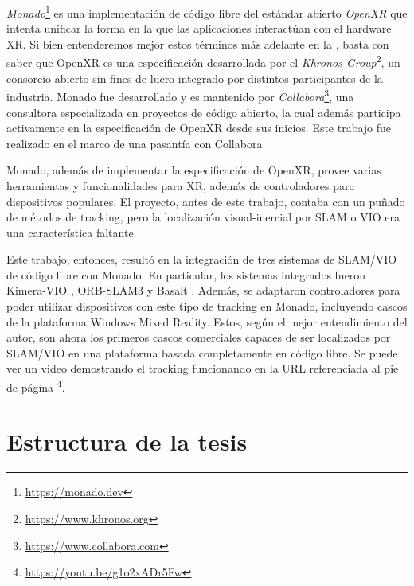 \documentclass[ twoside,openright,titlepage,numbers=noenddot,%
                headinclude,footinclude,cleardoublepage=empty,abstract=on,
                BCOR=-5mm,paper=a4,fontsize=11pt
                ]{scrreprt}
\begin{document}
\emph{Monado}\footnote{\url{https://monado.dev}} es una implementación
de código libre del estándar abierto \emph{OpenXR}
\autocite{thekhronosgroupinc.OpenXRSpecification} que intenta unificar
la forma en la que las aplicaciones interactúan con el hardware XR. Si
bien entenderemos mejor estos términos más adelante en la
, basta con saber que OpenXR es una
especificación desarrollada por el \emph{Khronos Group}\footnote{\url{https://www.khronos.org}},
un consorcio abierto sin fines de lucro integrado por distintos
participantes de la industria. Monado fue desarrollado y es mantenido
por \emph{Collabora}\footnote{\url{https://www.collabora.com}}, una
consultora especializada en proyectos de código abierto, la cual además
participa activamente en la especificación de OpenXR desde sus inicios.
Este trabajo fue realizado en el marco de una pasantía con Collabora.

Monado, además de implementar la especificación de OpenXR, provee varias
herramientas y funcionalidades para XR, además de controladores para
dispositivos populares. El proyecto, antes de este trabajo, contaba con
un puñado de métodos de tracking, pero la localización visual-inercial
por SLAM o VIO era una característica faltante.

Este trabajo, entonces, resultó en la integración de tres sistemas de
SLAM/VIO de código libre con Monado. En particular, los sistemas
integrados fueron Kimera-VIO
\autocite{rosinolKimeraOpenSourceLibrary2020}, ORB-SLAM3
\autocite{camposORBSLAM3AccurateOpenSource2021} y Basalt
\autocite{usenkoBasaltVisualInertialMapping2020}. Además, se adaptaron
controladores para poder utilizar dispositivos con este tipo de tracking
en Monado, incluyendo cascos de la plataforma Windows Mixed Reality.
Estos, según el mejor entendimiento del autor, son ahora los primeros
cascos comerciales capaces de ser localizados por SLAM/VIO en una
plataforma basada completamente en código libre. Se puede ver un video
demostrando el tracking funcionando en la URL referenciada al pie de
página \footnote{\url{https://youtu.be/g1o2xADr5Fw}}.

\clearpage

\hypertarget{estructura-de-la-tesis}{%
\section{Estructura de la tesis}\label{estructura-de-la-tesis}}
\end{document}
